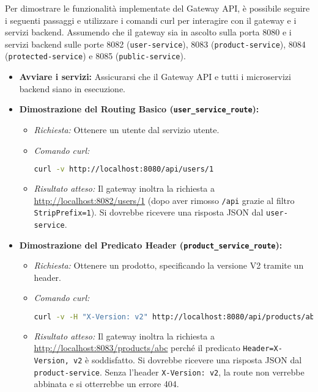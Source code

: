 Per dimostrare le funzionalità implementate del Gateway API, è possibile seguire i seguenti passaggi e utilizzare i comandi curl per interagire con il gateway e i servizi backend. Assumendo che il gateway sia in ascolto sulla porta 8080 e i servizi backend sulle porte 8082 (\texttt{user-service}), 8083 (\texttt{product-service}), 8084 (\texttt{protected-service}) e 8085 (\texttt{public-service}).
\begin{itemize}
    \item \textbf{Avviare i servizi:} Assicurarsi che il Gateway API e tutti i microservizi backend siano in esecuzione.
    

    \item \textbf{Dimostrazione del Routing Basico (\texttt{user\_service\_route}):}
    \begin{itemize}
        \item \textit{Richiesta:} Ottenere un utente dal servizio utente.
        \item \textit{Comando curl:}
        \begin{lstlisting}[language=bash]
curl -v http://localhost:8080/api/users/1 \end{lstlisting}
        \item \textit{Risultato atteso:} Il gateway inoltra la richiesta a \url{http://localhost:8082/users/1} (dopo aver rimosso \texttt{/api} grazie al filtro \texttt{StripPrefix=1}). Si dovrebbe ricevere una risposta JSON dal \texttt{user-service}.
    \end{itemize}

    \item \textbf{Dimostrazione del Predicato Header (\texttt{product\_service\_route}):}
    \begin{itemize}
        \item \textit{Richiesta:} Ottenere un prodotto, specificando la versione V2 tramite un header.
        \item \textit{Comando curl:}
        \begin{lstlisting}[language=bash]
curl -v -H "X-Version: v2" http://localhost:8080/api/products/abc \end{lstlisting}
        \item \textit{Risultato atteso:} Il gateway inoltra la richiesta a \url{http://localhost:8083/products/abc} perché il predicato \texttt{Header=X-Version, v2} è soddisfatto. Si dovrebbe ricevere una risposta JSON dal \texttt{product-service}. Senza l'header \texttt{X-Version: v2}, la route non verrebbe abbinata e si otterrebbe un errore 404.
    \end{itemize}


\end{itemize}
